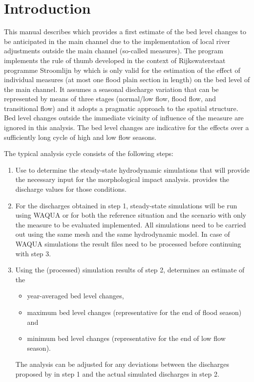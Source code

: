 \chapter{Introduction}

This manual describes \dfastmi which provides a first estimate of the bed level changes to be anticipated in the main channel due to the implementation of local river adjustments outside the main channel (so-called measures).
The program implements the rule of thumb developed in the context of Rijkswaterstaat programme Stroomlijn by \citep{Sieben2008} which is only valid for the estimation of the effect of individual measures (at most one flood plain section in length) on the bed level of the main channel.
It assumes a seasonal discharge variation that can be represented by means of three stages (normal/low flow, flood flow, and transitional flow) and it adopts a pragmatic approach to the spatial structure.
Bed level changes outside the immediate vicinity of influence of the measure are ignored in this analysis.
The bed level changes are indicative for the effects over a sufficiently long cycle of high and low flow seasons.

The typical analysis cycle consists of the following steps:

\begin{enumerate}
\item Use \dfastmi to determine the steady-state hydrodynamic simulations that will provide the necessary input for the morphological impact analysis.
\dfastmi provides the discharge values for those conditions.

\item For the discharges obtained in step 1, steady-state simulations will be run using WAQUA or \dflowfm for both the reference situation and the scenario with only the measure to be evaluated implemented.
All simulations need to be carried out using the same mesh and the same hydrodynamic model.
In case of WAQUA simulations the result files need to be processed before continuing with step 3.

\item Using the (processed) simulation results of step 2, \dfastmi determines an estimate of the
\begin{itemize}
\item year-averaged bed level changes,
\item maximum bed level changes (representative for the end of flood season) and
\item minimum bed level changes (representative for the end of low flow season).
\end{itemize}
The \dfastmi analysis can be adjusted for any deviations between the discharges proposed by \dfastmi in step 1 and the actual simulated discharges in step 2.
\end{enumerate}

